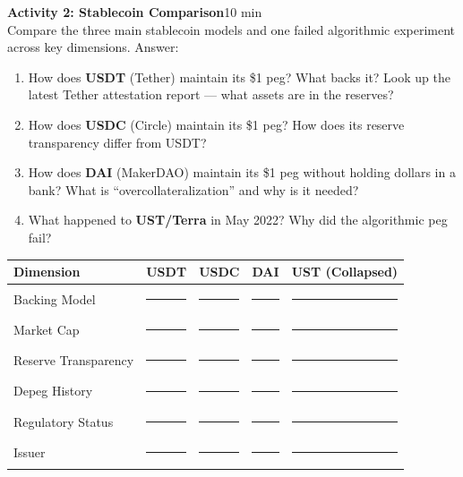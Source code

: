 \documentclass[11pt,a4paper]{article}
\newcommand{\activitybox}[3]{%
  \noindent\colorbox{mllavender4}{\parbox{\dimexpr\linewidth-2\fboxsep}{%
    \textbf{\color{mlpurple}#1}\hfill\textcolor{mlgray}{\small #2}\\[2pt]#3%
  }}\par\vspace{4pt}%
}
\newcommand{\fillcell}{\rule{2.2cm}{0.3pt}}
\begin{document}
\vspace{2pt}

\activitybox{Activity 2: Stablecoin Comparison}{10 min}{%
Compare the three main stablecoin models and one failed algorithmic experiment across key dimensions. Answer:
\begin{enumerate}
\item How does \textbf{USDT} (Tether) maintain its \$1 peg? What backs it? Look up the latest Tether attestation report --- what assets are in the reserves?
\item How does \textbf{USDC} (Circle) maintain its \$1 peg? How does its reserve transparency differ from USDT?
\item How does \textbf{DAI} (MakerDAO) maintain its \$1 peg without holding dollars in a bank? What is ``overcollateralization'' and why is it needed?
\item What happened to \textbf{UST/Terra} in May 2022? Why did the algorithmic peg fail?
\end{enumerate}
\vspace{4pt}
{\footnotesize\renewcommand{\arraystretch}{1.35}%
\setlength{\tabcolsep}{5pt}%
\begin{tabular}{@{}p{3.8cm}p{2.4cm}p{2.4cm}p{2.0cm}p{2.4cm}@{}}
\toprule
\textbf{Dimension} & \textbf{USDT} & \textbf{USDC} & \textbf{DAI} & \textbf{UST (Collapsed)} \\
\midrule
Backing Model         & \fillcell & \fillcell & \fillcell & \fillcell \\
Market Cap            & \fillcell & \fillcell & \fillcell & \fillcell \\
Reserve Transparency  & \fillcell & \fillcell & \fillcell & \fillcell \\
Depeg History         & \fillcell & \fillcell & \fillcell & \fillcell \\
Regulatory Status     & \fillcell & \fillcell & \fillcell & \fillcell \\
Issuer                & \fillcell & \fillcell & \fillcell & \fillcell \\
\bottomrule
\end{tabular}}
\vspace{2pt}
}

\vspace{2pt}
\end{document}

